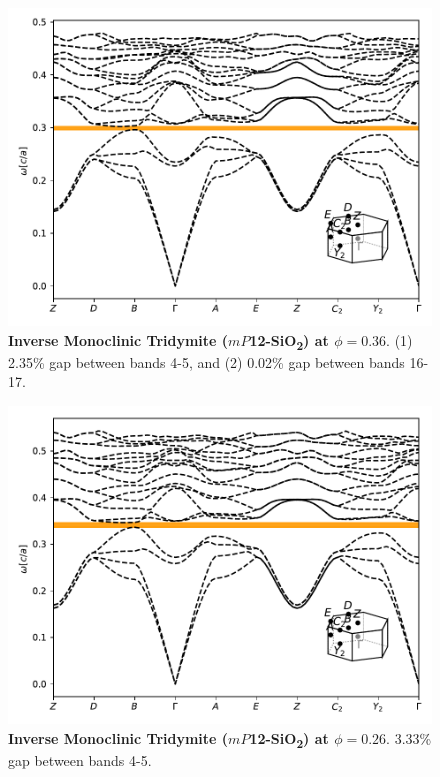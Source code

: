 \documentclass[fleqn,amsmath,amssymb,superscriptaddress, reprint,prl]{revtex4-1}
\begin{document}
\begin{figure}
\includegraphics[width=0.9\linewidth]{workspace/4d77408eb5666465d893f33d82520723/images/r=32.pdf}
	\caption{\textbf{Inverse Monoclinic Tridymite ($mP$12-SiO\textsubscript{2}) at $\phi=0.36$}. (1) 2.35\% gap between bands 4-5, and (2) 0.02\% gap between bands 16-17.}
\end{figure}

\begin{figure}
\includegraphics[width=0.9\linewidth]{workspace/4d77408eb5666465d893f33d82520723/images/r=35.pdf}
	\caption{\textbf{Inverse Monoclinic Tridymite ($mP$12-SiO\textsubscript{2}) at $\phi=0.26$}. 3.33\% gap between bands 4-5.}
\end{figure}
\end{document}
